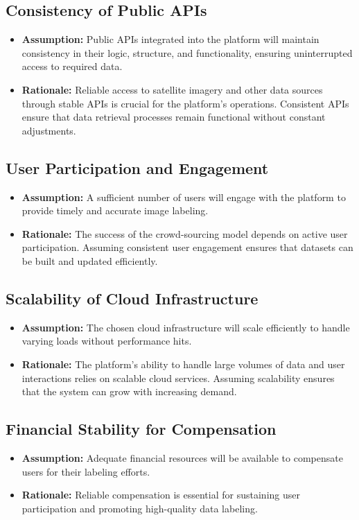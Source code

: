 \documentclass{article}
\begin{document}
\subsection*{Consistency of Public APIs}
\begin{itemize}
  \item \textbf{Assumption:} Public APIs integrated into the platform will maintain consistency in their logic, structure, and functionality, ensuring uninterrupted access to required data.
  \item \textbf{Rationale:} Reliable access to satellite imagery and other data sources through stable APIs is crucial for the platform's operations. Consistent APIs ensure that data retrieval processes remain functional without constant adjustments.
\end{itemize}

\subsection*{User Participation and Engagement}
\begin{itemize}
  \item \textbf{Assumption:} A sufficient number of users will engage with the platform to provide timely and accurate image labeling.
  \item \textbf{Rationale:} The success of the crowd-sourcing model depends on active user participation. Assuming consistent user engagement ensures that datasets can be built and updated efficiently.
\end{itemize}

\subsection*{Scalability of Cloud Infrastructure}
\begin{itemize}
  \item \textbf{Assumption:} The chosen cloud infrastructure will scale efficiently to handle varying loads without performance hits.
  \item \textbf{Rationale:} The platform's ability to handle large volumes of data and user interactions relies on scalable cloud services. Assuming scalability ensures that the system can grow with increasing demand.
\end{itemize}

\subsection*{Financial Stability for Compensation}
\begin{itemize}
  \item \textbf{Assumption:} Adequate financial resources will be available to compensate users for their labeling efforts.
  \item \textbf{Rationale:} Reliable compensation is essential for sustaining user participation and promoting high-quality data labeling.
\end{itemize}
\end{document}
